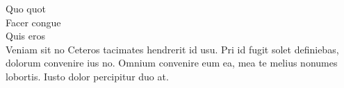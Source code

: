 \documentclass[12pt,a4paper]{letter}
\begin{document}
\begin{letter}{Quo quot \\ Facer congue \\ Quis eros \\ Veniam sit no}
%    
%    
%    
%    
%    
%    
%    
%    
%    
    Ceteros tacimates hendrerit id usu. Pri id fugit solet definiebas, dolorum convenire ius no. Omnium convenire eum ea, mea te melius nonumes lobortis. Iusto dolor percipitur duo at.
    

\end{letter}
\end{document}
